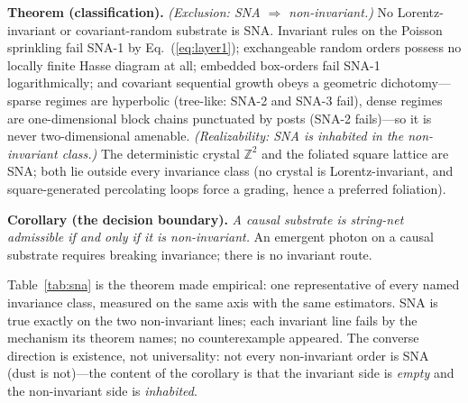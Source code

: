 \documentclass[aps,prd,reprint,nofootinbib,superscriptaddress,floatfix]{revtex4-2}
\begin{document}
\medskip
\noindent\textbf{Theorem (classification).}
\emph{(Exclusion: SNA $\Rightarrow$ non-invariant.)} No Lorentz-invariant or
covariant-random substrate is SNA. Invariant rules on the Poisson sprinkling fail
SNA-1 by Eq.~(\ref{eq:layer1}); exchangeable random orders possess no locally finite
Hasse diagram at all; embedded box-orders fail SNA-1 logarithmically; and covariant
sequential growth obeys a geometric dichotomy---sparse regimes are hyperbolic
(tree-like: SNA-2 and SNA-3 fail), dense regimes are one-dimensional block chains
punctuated by posts (SNA-2 fails)---so it is never two-dimensional amenable.
\emph{(Realizability: SNA is inhabited in the non-invariant class.)} The deterministic
crystal $\mathbb{Z}^2$ and the foliated square lattice are SNA; both lie outside every
invariance class (no crystal is Lorentz-invariant, and square-generated percolating
loops force a grading, hence a preferred foliation).

\medskip
\noindent\textbf{Corollary (the decision boundary).} \emph{A causal substrate is
string-net admissible if and only if it is non-invariant.} An emergent photon on a
causal substrate requires breaking invariance; there is no invariant route.

\medskip
Table~\ref{tab:sna} is the theorem made empirical: one representative of every named
invariance class, measured on the same axis with the same estimators. SNA is true
exactly on the two non-invariant lines; each invariant line fails by the mechanism its
theorem names; no counterexample appeared. The converse direction is existence, not
universality: not every non-invariant order is SNA (dust is not)---the content of the
corollary is that the invariant side is \emph{empty} and the non-invariant side is
\emph{inhabited}.
\end{document}
